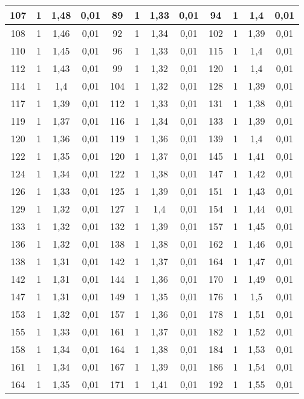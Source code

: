 \documentclass[a4paper,12pt,spanish]{article}
\begin{document}
\begin{longtable}{|*{12}{c|}}
		107 & 1 & 1,48 & 0,01 & 89 & 1 & 1,33 & 0,01 & 94 & 1 & 1,4 & 0,01 \\ \hline 
		108 & 1 & 1,46 & 0,01 & 92 & 1 & 1,34 & 0,01 & 102 & 1 & 1,39 & 0,01 \\ \hline 
		110 & 1 & 1,45 & 0,01 & 96 & 1 & 1,33 & 0,01 & 115 & 1 & 1,4 & 0,01 \\ \hline 
		112 & 1 & 1,43 & 0,01 & 99 & 1 & 1,32 & 0,01 & 120 & 1 & 1,4 & 0,01 \\ \hline 
		114 & 1 & 1,4 & 0,01 & 104 & 1 & 1,32 & 0,01 & 128 & 1 & 1,39 & 0,01 \\ \hline 
		117 & 1 & 1,39 & 0,01 & 112 & 1 & 1,33 & 0,01 & 131 & 1 & 1,38 & 0,01 \\ \hline 
		119 & 1 & 1,37 & 0,01 & 116 & 1 & 1,34 & 0,01 & 133 & 1 & 1,39 & 0,01 \\ \hline 
		120 & 1 & 1,36 & 0,01 & 119 & 1 & 1,36 & 0,01 & 139 & 1 & 1,4 & 0,01 \\ \hline 
		122 & 1 & 1,35 & 0,01 & 120 & 1 & 1,37 & 0,01 & 145 & 1 & 1,41 & 0,01 \\ \hline 
		124 & 1 & 1,34 & 0,01 & 122 & 1 & 1,38 & 0,01 & 147 & 1 & 1,42 & 0,01 \\ \hline 
		126 & 1 & 1,33 & 0,01 & 125 & 1 & 1,39 & 0,01 & 151 & 1 & 1,43 & 0,01 \\ \hline 
		129 & 1 & 1,32 & 0,01 & 127 & 1 & 1,4 & 0,01 & 154 & 1 & 1,44 & 0,01 \\ \hline 
		133 & 1 & 1,32 & 0,01 & 132 & 1 & 1,39 & 0,01 & 157 & 1 & 1,45 & 0,01 \\ \hline 
		136 & 1 & 1,32 & 0,01 & 138 & 1 & 1,38 & 0,01 & 162 & 1 & 1,46 & 0,01 \\ \hline 
		138 & 1 & 1,31 & 0,01 & 142 & 1 & 1,37 & 0,01 & 164 & 1 & 1,47 & 0,01 \\ \hline 
		142 & 1 & 1,31 & 0,01 & 144 & 1 & 1,36 & 0,01 & 170 & 1 & 1,49 & 0,01 \\ \hline 
		147 & 1 & 1,31 & 0,01 & 149 & 1 & 1,35 & 0,01 & 176 & 1 & 1,5 & 0,01 \\ \hline 
		153 & 1 & 1,32 & 0,01 & 157 & 1 & 1,36 & 0,01 & 178 & 1 & 1,51 & 0,01 \\ \hline 
		155 & 1 & 1,33 & 0,01 & 161 & 1 & 1,37 & 0,01 & 182 & 1 & 1,52 & 0,01 \\ \hline 
		158 & 1 & 1,34 & 0,01 & 164 & 1 & 1,38 & 0,01 & 184 & 1 & 1,53 & 0,01 \\ \hline 
		161 & 1 & 1,34 & 0,01 & 167 & 1 & 1,39 & 0,01 & 186 & 1 & 1,54 & 0,01 \\ \hline 
		164 & 1 & 1,35 & 0,01 & 171 & 1 & 1,41 & 0,01 & 192 & 1 & 1,55 & 0,01 \\ \hline 

\end{longtable}
\end{document}
